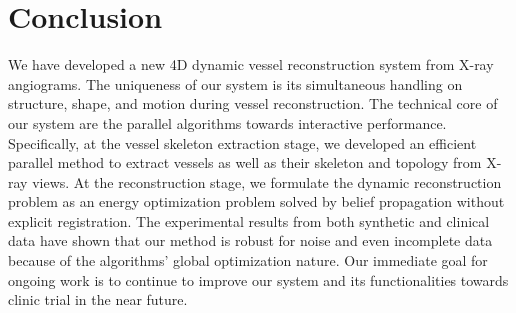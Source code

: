 \documentclass[journal]{IEEEtran}
\begin{document}
\section{Conclusion}
We have developed a new 4D dynamic vessel reconstruction system from
X-ray angiograms. The uniqueness of our system is its simultaneous
handling on structure, shape, and motion during vessel reconstruction.
The technical core of our system are the parallel algorithms towards
interactive performance. Specifically, at the vessel skeleton
extraction stage, we developed an efficient parallel method to extract
vessels as well as their skeleton and topology from X-ray views. At
the reconstruction stage, we formulate the dynamic reconstruction
problem as an energy optimization problem solved by belief propagation
without explicit registration. The experimental results from both
synthetic and clinical data have shown that our method is robust for
noise and even incomplete data because of the algorithms' global
optimization nature. Our immediate goal for ongoing work is to
continue to improve our system and its functionalities towards clinic
trial in the near future.


%
%
%
%
\end{document}
